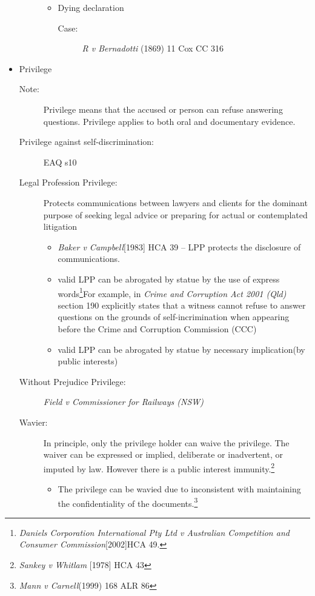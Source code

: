 \begin{itemize}
\begin{description}
\begin{itemize}
                    \item Dying declaration
                        \begin{description}
                            \item[Case:] \textit{R v Bernadotti} (1869) 11 Cox CC 316 
                        \end{description}
                \end{itemize}
        \end{description}
    \item Privilege
        \begin{description}
            \item[Note:] Privilege means that the accused or person can refuse answering questions. Privilege applies to both oral and documentary evidence. 
            \item[Privilege against self-discrimination:]EAQ s10 
            \item[Legal Profession Privilege:]Protects communications between lawyers and clients for the dominant purpose of seeking legal advice or preparing for actual or contemplated litigation
                \begin{itemize}
                    \item \textit{Baker v Campbell}[1983] HCA 39 -- LPP protects the disclosure of communications.
                    \item valid LPP can be abrogated by statue by the use of express words\footnote{\textit{Daniels Corporation International Pty Ltd v Australian Competition and Consumer Commission}[2002]HCA 49.}For example, in \textit{Crime and Corruption Act 2001 (Qld)} section 190 explicitly states that a witness cannot refuse to answer questions on the grounds of self-incrimination when appearing before the Crime and Corruption Commission (CCC)
                    \item valid LPP can be abrogated by statue by necessary implication(by public interests)
                \end{itemize}
            \item[Without Prejudice Privilege:]\textit{Field v Commissioner for Railways (NSW)}
            \item[Wavier:] In principle, only the privilege holder can waive the privilege. The waiver can be expressed or implied, deliberate or inadvertent, or imputed by law. However there is a public interest immunity.\footnote{\textit{Sankey v Whitlam} [1978] HCA 43}
                \begin{itemize}
                    \item The privilege can be wavied due to inconsistent with maintaining the confidentiality of the documents.\footnote{\textit{Mann v Carnell}(1999) 168 ALR 86}
                

\end{itemize}
\end{description}
\end{itemize}

